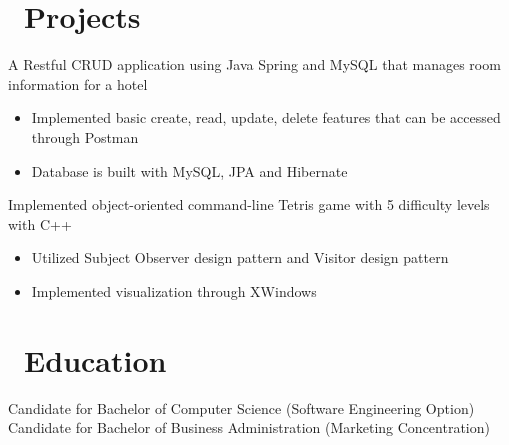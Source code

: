 \documentclass{resume}
\begin{document}
\section{\faStar\ Projects}

A Restful CRUD application using Java Spring and MySQL that manages room information for a hotel
\begin{itemize}
  \item Implemented basic create, read, update, delete features that can be accessed through Postman
  \item Database is built with MySQL, JPA and Hibernate
\end{itemize}

Implemented object-oriented command-line Tetris game with 5 difficulty levels with C++
\begin{itemize}
  \item Utilized Subject Observer design pattern and Visitor design pattern
  \item Implemented visualization through XWindows
\end{itemize}

\section{\faGraduationCap\ Education}
Candidate for Bachelor of Computer Science (Software Engineering Option)
Candidate for Bachelor of Business Administration (Marketing Concentration)

\begin{comment}
\section{\faHeartO\ Activities and Awards}
\begin{itemize}[parsep=0.5ex]
  \item Hack the North 2017 Participant
  \item University of Waterloo President’s Scholarship of Distinction
  \item Euclid Mathematics Competition Scholarship
\end{itemize}

\section{\faInfo\ Miscellaneous}
\begin{itemize}[parsep=0.5ex]
  \item Languages: English - Fluent, Mandarin - Native speaker, Korean -  fluent
\end{itemize}

\end{comment}
\end{document}
